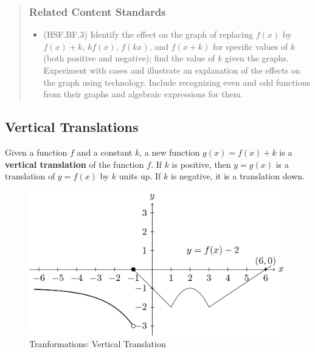\documentclass[
]{book}
\providecommand{\tightlist}{%
  \setlength{\itemsep}{0pt}\setlength{\parskip}{0pt}}
\theoremstyle{definition}
\theoremstyle{definition}
\theoremstyle{definition}
\theoremstyle{remark}
\begin{document}
\begin{quote}
\hypertarget{related-content-standards-41}{%
\subsubsection*{Related Content Standards}\label{related-content-standards-41}}

\begin{itemize}
\tightlist
\item
  (HSF.BF.3) Identify the effect on the graph of replacing \(f(x)\) by \(f(x) + k\), \(k f(x)\), \(f(kx)\), and \(f(x + k)\) for specific values of \(k\) (both positive and negative); find the value of \(k\) given the graphs. Experiment with cases and illustrate an explanation of the effects on the graph using technology. Include recognizing even and odd functions from their graphs and algebraic expressions for them.
\end{itemize}
\end{quote}

\hypertarget{vertical-translations}{%
\subsection{Vertical Translations}\label{vertical-translations}}

Given a function \(f\) and a constant \(k\), a new function \(g(x)=f(x)+k\) is a \textbf{vertical translation} of the function \(f\). If \(k\) is positive, then \(y=g(x)\) is a translation of \(y=f(x)\) by \(k\) units up. If \(k\) is negative, it is a translation down.

\begin{figure}

{\centering \includegraphics[width=0.8\linewidth]{tikz/vertical-translation} 

}

\caption{Tranformations: Vertical Translation}\label{fig:vertical-translation}
\end{figure}
\end{document}
